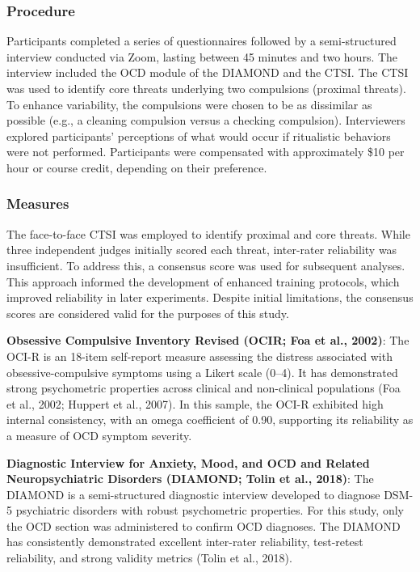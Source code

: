\documentclass[
  man,floatsintext]{apa7}
\begin{document}
\subsubsection{Procedure}\label{procedure}

Participants completed a series of questionnaires followed by a semi-structured interview conducted via Zoom, lasting between 45 minutes and two hours.
The interview included the OCD module of the DIAMOND and the CTSI.
The CTSI was used to identify core threats underlying two compulsions (proximal threats).
To enhance variability, the compulsions were chosen to be as dissimilar as possible (e.g., a cleaning compulsion versus a checking compulsion).
Interviewers explored participants' perceptions of what would occur if ritualistic behaviors were not performed.
Participants were compensated with approximately \$10 per hour or course credit, depending on their preference.

\subsubsection{Measures}\label{measures-1}

The face-to-face CTSI was employed to identify proximal and core threats.
While three independent judges initially scored each threat, inter-rater reliability was insufficient.
To address this, a consensus score was used for subsequent analyses.
This approach informed the development of enhanced training protocols, which improved reliability in later experiments.
Despite initial limitations, the consensus scores are considered valid for the purposes of this study.

\textbf{Obsessive Compulsive Inventory Revised (OCIR; Foa et al., 2002)}:
The OCI-R is an 18-item self-report measure assessing the distress associated with obsessive-compulsive symptoms using a Likert scale (0--4).
It has demonstrated strong psychometric properties across clinical and non-clinical populations (Foa et al., 2002; Huppert et al., 2007).
In this sample, the OCI-R exhibited high internal consistency, with an omega coefficient of 0.90, supporting its reliability as a measure of OCD symptom severity.

\textbf{Diagnostic Interview for Anxiety, Mood, and OCD and Related Neuropsychiatric Disorders (DIAMOND; Tolin et al., 2018)}:
The DIAMOND is a semi-structured diagnostic interview developed to diagnose DSM-5 psychiatric disorders with robust psychometric properties.
For this study, only the OCD section was administered to confirm OCD diagnoses.
The DIAMOND has consistently demonstrated excellent inter-rater reliability, test-retest reliability, and strong validity metrics (Tolin et al., 2018).
\end{document}

